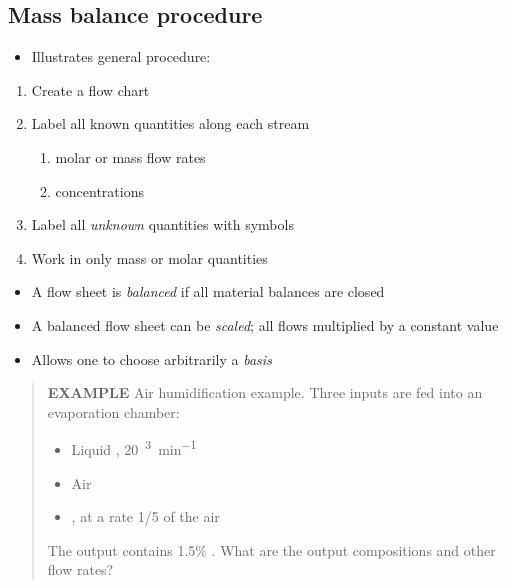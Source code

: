 \documentclass[11pt]{article}
\begin{document}
\subsection{Mass balance procedure}
\label{sec-5-3}
\begin{itemize}
\item Illustrates general procedure:
\end{itemize}

\hline
\begin{enumerate}
\item Create a flow chart
\item Label all known quantities along each stream
\begin{enumerate}
\item molar or mass flow rates
\item concentrations
\end{enumerate}
\item Label all \emph{unknown} quantities with symbols
\item Work in only mass or molar quantities
\end{enumerate}
\hline

\begin{itemize}
\item A flow sheet is \emph{balanced} if all material balances are closed
\item A balanced flow sheet can be \emph{scaled}; all flows multiplied by a constant value
\item Allows one to choose arbitrarily a \emph{basis}
\end{itemize}

\begin{quote}
\textbf{EXAMPLE} Air humidification example.  Three inputs are fed into an evaporation chamber:

\begin{itemize}
\item Liquid , \SI{20}{\centimeter\cubed\per\minute}
\item Air
\item {}, at a rate 1/5 of the air
\end{itemize}

The output contains 1.5\% .  What are the output compositions and other flow rates?
\end{quote}
\end{document}
